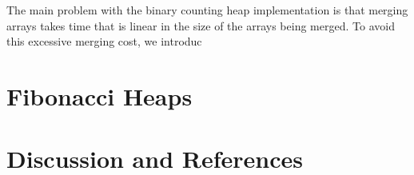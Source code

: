 The main problem with the binary counting heap implementation is that
merging arrays takes time that is linear in the size of the arrays
being merged.  To avoid this excessive merging cost, we introduc

\section{Fibonacci Heaps}

\section{Discussion and References}
